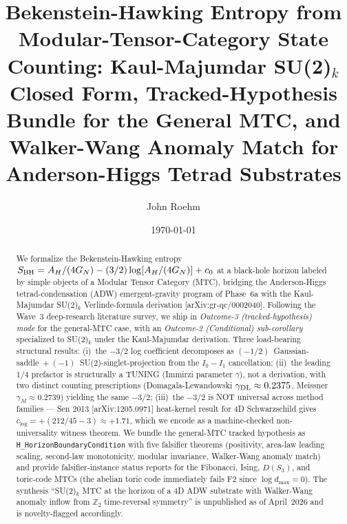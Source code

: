 \documentclass[aps,prd,twocolumn,showpacs,superscriptaddress,nofootinbib]{revtex4-2}
\newcommand{\SBH}{S_{\rm BH}}
\newcommand{\AH}{A_H}
\newcommand{\dmax}{d_{\max}}
\begin{document}
\title{Bekenstein-Hawking Entropy from Modular-Tensor-Category State Counting:
Kaul-Majumdar SU(2)$_k$ Closed Form, Tracked-Hypothesis Bundle for the
General MTC, and Walker-Wang Anomaly Match for Anderson-Higgs Tetrad
Substrates}

\author{John Roehm}

\date{\today}

\begin{abstract}
We formalize the Bekenstein-Hawking entropy
$\SBH = \AH/(4 G_N) - (3/2) \log[\AH/(4 G_N)] + c_0$ at a black-hole horizon
labeled by simple objects of a Modular Tensor Category (MTC), bridging
the Anderson-Higgs tetrad-condensation (ADW) emergent-gravity program
of Phase~6a with the Kaul-Majumdar SU(2)$_k$ Verlinde-formula derivation
[arXiv:gr-qc/0002040]. Following the Wave~3 deep-research literature
survey, we ship in \emph{Outcome-3 (tracked-hypothesis) mode} for the
general-MTC case, with an \emph{Outcome-2 (Conditional) sub-corollary}
specialized to SU(2)$_k$ under the Kaul-Majumdar derivation. Three
load-bearing structural results:
(i)~the $-3/2$ log coefficient decomposes as
$(-1/2)$~Gaussian-saddle~$+~(-1)$~SU(2)-singlet-projection from the
$I_0 - I_1$ cancellation;
(ii)~the leading $1/4$ prefactor is structurally a TUNING (Immirzi
parameter $\gamma$), not a derivation, with two distinct counting
prescriptions (Domagala-Lewandowski $\gamma_{\rm DL} \approx 0.2375$,
Meissner $\gamma_M \approx 0.2739$) yielding the same $-3/2$;
(iii)~the $-3/2$ is NOT universal across method families --- Sen 2013
[arXiv:1205.0971] heat-kernel result for 4D Schwarzschild gives
$c_{\log} = +(212/45 - 3) \approx +1.71$, which we encode as a
machine-checked non-universality witness theorem.
We bundle the general-MTC tracked hypothesis as
\texttt{H\_HorizonBoundaryCondition} with five falsifier theorems
(positivity, area-law leading scaling, second-law monotonicity,
modular invariance, Walker-Wang anomaly match) and provide
falsifier-instance status reports for the Fibonacci, Ising,
$D(S_3)$, and toric-code MTCs (the abelian toric code immediately
fails F2 since $\log\dmax = 0$). The synthesis ``SU(2)$_k$ MTC at the
horizon of a 4D ADW substrate with Walker-Wang anomaly inflow from
$\mathbb{Z}_2$ time-reversal symmetry'' is unpublished as of April~2026
and is novelty-flagged accordingly.
\end{abstract}

\maketitle
\end{document}
